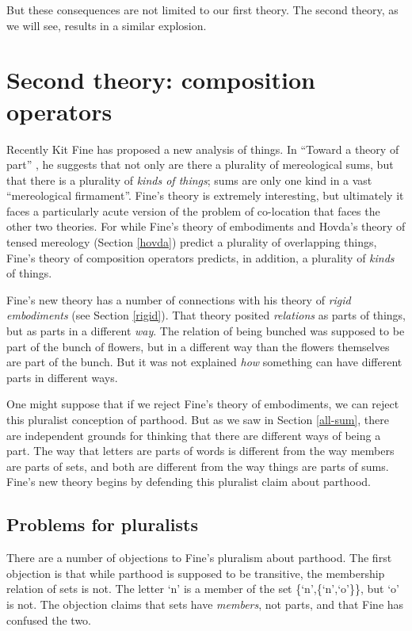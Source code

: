 \documentclass[12pt,twoside]{reedfancy}
\begin{document}
\begin{spacing}{1.25}
But these consequences are not limited to our first theory.  The
second theory, as we will see, results in a similar explosion.

\section{Second theory: composition operators}
\label{fine-c}
Recently Kit Fine has proposed a new analysis of things.  In ``Toward
a theory of part'' \citeyearpar{fine2010}, he suggests that not only
are there a plurality of mereological sums, but that there is a
plurality of {\em kinds of things}; sums are only one kind in a vast
``mereological firmament''.  Fine's theory is extremely interesting,
but ultimately it faces a particularly acute version of the problem of
co-location that faces the other two theories.  For while Fine's
theory of embodiments and Hovda's theory of tensed mereology (Section
\ref{hovda}) predict a plurality of overlapping things, Fine's theory
of composition operators predicts, in addition, a plurality of {\em
  kinds} of things.

Fine's new theory has a number of connections with his theory of {\em
  rigid embodiments} (see Section \ref{rigid}).  That theory posited
{\em relations} as parts of things, but as parts in a different {\em
  way}.  The relation of being bunched was supposed to be part of the
bunch of flowers, but in a different way than the flowers themselves
are part of the bunch.  But it was not explained {\em how} something
can have different parts in different ways.  

One might suppose that if we reject Fine's theory of embodiments, we
can reject this pluralist conception of parthood.  But as we saw in
Section \ref{all-sum}, there are independent grounds for thinking that
there are different ways of being a part.  The way that letters are
parts of words is different from the way members are parts of sets,
and both are different from the way things are parts of sums.  Fine's
new theory begins by defending this pluralist claim about parthood.

\subsection{Problems for pluralists}
\label{sets}
There are a number of objections to Fine's pluralism about parthood.
The first objection is that while parthood is supposed to be
transitive, the membership relation of sets is not.  The letter `n' is
a member of the set \{`n',\{`n',`o'\}\}, but `o' is not.  The
objection claims that sets have {\em members}, not parts, and that
Fine has confused the two.


\end{spacing}
\end{document}
